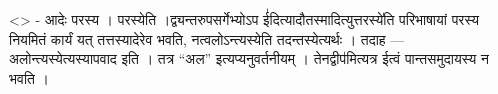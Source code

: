\textless{}\textgreater{} - आदेः परस्य । परस्येति
।द्व्यन्तरुपसर्गेभ्योऽप ई॑दित्यादौतस्मादित्युत्तरस्ये॑ति परिभाषायां
परस्य नियमितं कार्यं यत् तत्तस्यादेरेव भवति, नत्वलोऽन्त्यस्येति
तदन्तस्येत्यर्थः । तदाह --- अलोन्त्यस्येत्यस्यापवाद इति । तत्र ``अल''
इत्यप्यनुवर्तनीयम् । तेनद्वीप॑मित्यत्र ईत्वं पान्तसमुदायस्य न भवति ।
